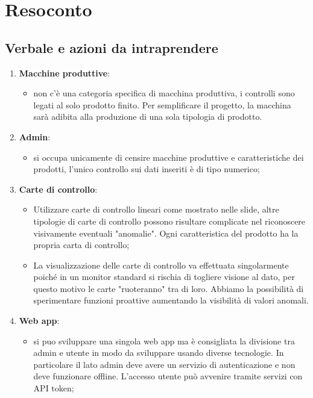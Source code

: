 \section{Resoconto}
\subsection{Verbale e azioni da intraprendere}

\begin{enumerate}
	\item \textbf{Macchine produttive}:
		\begin{itemize}
			\item non c'è una categoria specifica di macchina produttiva, i controlli sono legati al  solo prodotto finito. Per semplificare il progetto, la macchina sarà adibita alla produzione di una sola tipologia di prodotto.
		\end{itemize}
	\item \textbf{Admin}:
		\begin{itemize}
			\item si occupa unicamente di censire macchine produttive e caratteristiche dei prodotti, l'unico controllo sui dati inseriti è di tipo numerico;
		\end{itemize}
	\item \textbf{Carte di controllo}:
		\begin{itemize}
			\item Utilizzare carte di controllo lineari come mostrato nelle slide, altre tipologie di carte di controllo possono risultare complicate nel riconoscere visivamente eventuali "anomalie". Ogni caratteristica del prodotto ha la propria carta di controllo;
			\item La visualizzazione delle carte di controllo va effettuata singolarmente poiché in un monitor standard si rischia di togliere visione al dato, per questo motivo le carte "ruoteranno" tra di loro. Abbiamo la possibilità di sperimentare funzioni proattive aumentando la visibilità di valori anomali.
		\end{itemize}
	\item \textbf{Web app}:
		\begin{itemize}
			\item si puo sviluppare una singola web app\glo{} ma è consigliata la divisione tra admin e utente in modo da sviluppare usando diverse tecnologie. In particolare il lato admin deve avere un servizio di autenticazione e non deve funzionare offline. L'accesso utente può avvenire tramite servizi con API token;

\end{itemize}
\end{enumerate}
